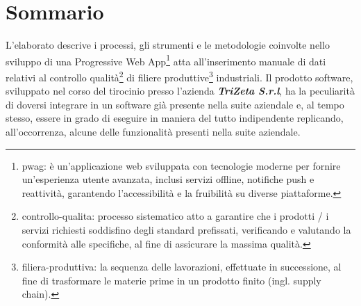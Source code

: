 \cleardoublepage
{}
{}
\begingroup
\let\clearpage\relax
\let\cleardoublepage\relax
\let\cleardoublepage\relax

\chapter*{Sommario}
L'elaborato descrive i processi, gli strumenti e le metodologie coinvolte nello sviluppo di una Progressive Web App\footnote{\gls{pwag}: è un'applicazione web sviluppata con tecnologie moderne per fornire un'esperienza utente avanzata, inclusi servizi offline, notifiche push e reattività, garantendo l'accessibilità e la fruibilità su diverse piattaforme.} 
atta all'inserimento manuale di dati relativi al controllo qualità\footnote{\gls{controllo-qualita}: processo sistematico atto a garantire che i prodotti / i servizi richiesti soddisfino degli standard prefissati, verificando e valutando la conformità alle specifiche, al fine di assicurare la massima qualità.} di 
filiere produttive\footnote{\gls{filiera-produttiva}: la sequenza delle lavorazioni, effettuate in successione, al fine di trasformare le materie prime in un prodotto finito (ingl. supply chain).} industriali. 
\newline
Il prodotto software, sviluppato nel corso del tirocinio presso l'azienda \textit{\textbf{TriZeta S.r.l}}, ha la peculiarità di doversi integrare in un software già presente nella suite aziendale e, al tempo stesso, essere in grado di eseguire in maniera del tutto indipendente replicando, all'occorrenza, alcune delle funzionalità presenti nella suite aziendale.



\endgroup

\vfill
